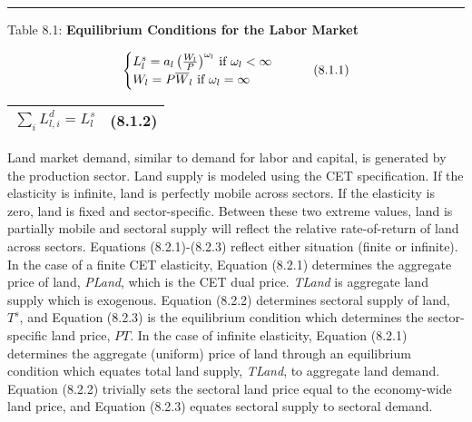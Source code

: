 \documentclass{article}
\begin{document}
\noindent\rule{\linewidth}{0.4pt}
\begin{center}
\begin{large}
{\centering Table 8.1: \textbf{Equilibrium Conditions for the Labor Market} \par}

\begin{equation}
    \begin{cases}
      $$L^s_l = a_l \left(\frac{W_l}{P} \right)^{\omega_l}$$ \text{ if } $$\omega_l < \infty$$\\
      $$W_l = P \overline{W}_l$$ \text{ if } $$\omega_l = \infty$$\\
    \end{cases}       
    \tag{8.1.1}
\end{equation}

\begin{tabular}{>{\raggedright}p{} l}

$\displaystyle \sum_i L^d_{l, i} = L^s_l$ & (8.1.2)\\[15pt]

\hline
\end{tabular}
\end{large}
\end{center}

Land market demand, similar to demand for labor and capital, is generated by the production sector. Land supply is modeled using the CET specification. If the elasticity is infinite, land is perfectly mobile across sectors. If the elasticity is zero, land is fixed and sector-specific. Between these two extreme values, land is partially mobile and sectoral supply will reflect the relative rate-of-return of land across sectors. Equations (8.2.1)-(8.2.3) reflect either situation (finite or infinite). In the case of a finite CET elasticity, Equation (8.2.1) determines the aggregate price of land, \textit{PLand}, which is the CET dual price. \textit{TLand} is aggregate land supply which is exogenous. Equation (8.2.2) determines sectoral supply of land, $T^s$, and Equation (8.2.3) is the equilibrium condition which determines the sector-specific land price, $PT$. In the case of infinite elasticity, Equation (8.2.1) determines the aggregate (uniform) price of land through an equilibrium condition which equates total land supply, \textit{TLand}, to aggregate land demand. Equation (8.2.2) trivially sets the sectoral land price equal to the economy-wide land price, and Equation (8.2.3) equates sectoral supply to sectoral demand.
\end{document}
